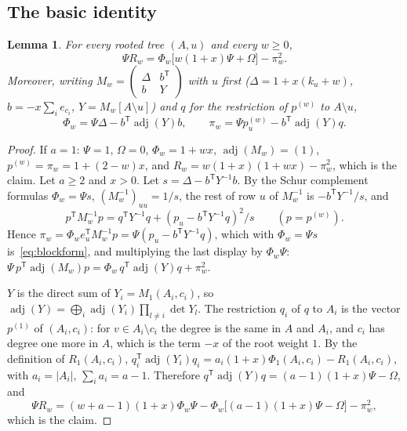 \documentclass[11pt]{amsart}
\newtheorem{lemma}[theorem]{Lemma}
\theoremstyle{definition}
\theoremstyle{remark}
\newcommand{\adj}{\operatorname{adj}}
\newcommand{\T}{\mathsf T}
\begin{document}
\subsection{The basic identity}

\begin{lemma}\label{lem:star}
For every rooted tree $(A,u)$ and every $w\ge0$,
\[
\Psi R_w=\Phi_w\bigl[w(1+x)\Psi+\Omega\bigr]-\pi_w^2 .
\]
Moreover, writing $M_w=\left(\begin{smallmatrix}\Delta&b^\T\\b&Y\end{smallmatrix}\right)$
with $u$ first ($\Delta=1+x(k_u+w)$, $b=-x\sum_ie_{c_i}$, $Y=M_w[A\setminus u]$)
and $q$ for the restriction of $p^{(w)}$ to $A\setminus u$,
\begin{equation}\label{eq:blockform}
\Phi_w=\Psi\Delta-b^\T\adj(Y)b,\qquad \pi_w=\Psi p^{(w)}_u-b^\T\adj(Y)q .
\end{equation}
\end{lemma}

\begin{proof}
If $a=1$: $\Psi=1$, $\Omega=0$, $\Phi_w=1+wx$, $\adj(M_w)=(1)$,
$p^{(w)}=\pi_w=1+(2-w)x$, and $R_w=w(1+x)(1+wx)-\pi_w^2$, which is the claim.
Let $a\ge2$ and $x>0$. Let $s=\Delta-b^\T Y^{-1}b$. By the Schur complement
formulas $\Phi_w=\Psi s$, $(M_w^{-1})_{uu}=1/s$, the rest of row $u$ of
$M_w^{-1}$ is $-b^\T Y^{-1}/s$, and
\[
p^\T M_w^{-1}p=q^\T Y^{-1}q+(p_u-b^\T Y^{-1}q)^2/s\qquad(p=p^{(w)}).
\]
Hence $\pi_w=\Phi_we_u^\T M_w^{-1}p=\Psi(p_u-b^\T Y^{-1}q)$, which
with $\Phi_w=\Psi s$ is~\eqref{eq:blockform}, and multiplying the last display by
$\Phi_w\Psi$:
$\Psi\,p^\T\adj(M_w)p=\Phi_w\,q^\T\adj(Y)q+\pi_w^2$.

$Y$ is the direct sum of $Y_i=M_1(A_i,c_i)$, so
$\adj(Y)=\bigoplus_i\adj(Y_i)\prod_{l\ne i}\det Y_l$. The restriction $q_i$ of
$q$ to $A_i$ is the vector $p^{(1)}$ of $(A_i,c_i)$: for $v\in A_i\setminus c_i$
the degree is the same in $A$ and $A_i$, and $c_i$ has degree one more in
$A$, which is the term $-x$ of the root weight $1$. By the definition of
$R_1(A_i,c_i)$, $q_i^\T\adj(Y_i)q_i=a_i(1+x)\Phi_1(A_i,c_i)-R_1(A_i,c_i)$, with
$a_i=|A_i|$, $\sum_ia_i=a-1$. Therefore
$q^\T\adj(Y)q=(a-1)(1+x)\Psi-\Omega$, and
\[
\Psi R_w=(w+a-1)(1+x)\Phi_w\Psi-\Phi_w\bigl[(a-1)(1+x)\Psi-\Omega\bigr]-\pi_w^2,
\]
which is the claim.
\end{proof}
\end{document}
